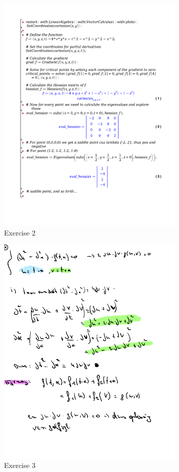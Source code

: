 \documentclass[a4paper]{article}
\begin{document}


\begin{figure}[H]
	\centering
	\includegraphics[width=0.8\textwidth]{exercises/bord_4_ex_2.pdf}
	\caption{Exercise 2}
	\label{fig:bord_4_ex_2}
\end{figure}


\begin{figure}[H]
	\centering
	\includegraphics[width=0.8\textwidth]{assets/bord_4_ex_3.png}
	\caption{Exercise 3}
	\label{fig:bord_4_ex_3}
\end{figure}
\end{document}
